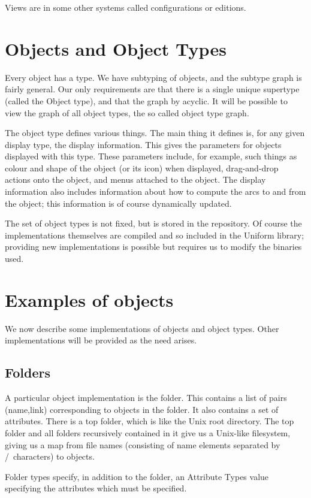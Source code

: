 \documentclass[a4paper]{article}
\begin{document}
Views are in some other systems called configurations or editions.

\section{Objects and Object Types}
Every object has a type.  We have subtyping of objects, and the subtype
graph is fairly general.  Our only requirements are that there is
a single unique supertype (called the Object type), and that the graph 
by acyclic.  It will be possible to view the graph of all object types, the 
so called object type graph.

The object type defines various things.  The main thing it defines is, for
any given display type, the display information. This gives the parameters
for objects displayed with this type.  These parameters include, for example,
such things as colour and shape of the object (or its icon) when displayed, 
drag-and-drop actions onto the object, and menus attached to the object. 
The display information also includes information about how to compute the
arcs to and from the object; this information is of course dynamically updated.

The set of object types is not fixed, but is stored in the repository.
Of course the implementations themselves are compiled and so included in the
Uniform library; providing new implementations is possible but requires us
to modify the binaries used.
\par
\section{Examples of objects}
We now describe some implementations of objects and object types.  Other
implementations will be provided as the need arises.
\subsection{Folders}
A particular object implementation is the folder.  
This contains a list of pairs (name,link)
corresponding to objects in the folder.  It also contains a set of attributes.
There is a top folder, which is like the Unix root directory.  The top folder
and all folders recursively contained in it give us a Unix-like filesystem,
giving us a map from file names (consisting of name elements separated by 
\slash\ characters) to objects.
\par
Folder types specify, in addition to the folder, an Attribute Types value
specifying the attributes which must be specified.
\par
\end{document}
